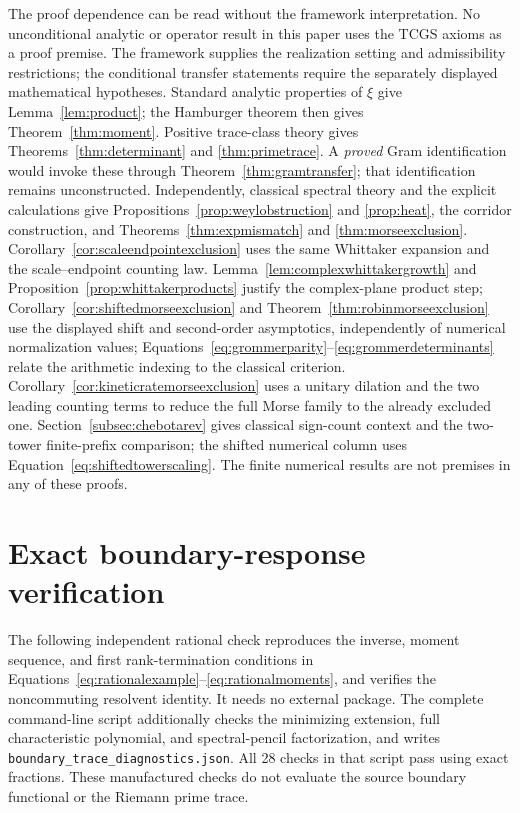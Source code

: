 \documentclass[11pt,letterpaper]{article}
\numberwithin{equation}{section}
\theoremstyle{definition}
\theoremstyle{remark}
\begin{document}
\begin{samepage}
The proof dependence can be read without the framework interpretation. No unconditional analytic or operator result in this paper uses the TCGS axioms as a proof premise. The framework supplies the realization setting and admissibility restrictions; the conditional transfer statements require the separately displayed mathematical hypotheses. Standard analytic properties of $\xi$ give Lemma~\ref{lem:product}; the Hamburger theorem then gives Theorem~\ref{thm:moment}. Positive trace-class theory gives Theorems~\ref{thm:determinant} and \ref{thm:primetrace}. A \emph{proved} Gram identification would invoke these through Theorem~\ref{thm:gramtransfer}; that identification remains unconstructed. Independently, classical spectral theory and the explicit calculations give Propositions~\ref{prop:weylobstruction} and \ref{prop:heat}, the corridor construction, and Theorems~\ref{thm:expmismatch} and \ref{thm:morseexclusion}. Corollary~\ref{cor:scaleendpointexclusion} uses the same Whittaker expansion and the scale--endpoint counting law. Lemma~\ref{lem:complexwhittakergrowth} and Proposition~\ref{prop:whittakerproducts} justify the complex-plane product step; Corollary~\ref{cor:shiftedmorseexclusion} and Theorem~\ref{thm:robinmorseexclusion} use the displayed shift and second-order asymptotics, independently of numerical normalization values; Equations~\eqref{eq:grommerparity}--\eqref{eq:grommerdeterminants} relate the arithmetic indexing to the classical criterion. Corollary~\ref{cor:kineticratemorseexclusion} uses a unitary dilation and the two leading counting terms to reduce the full Morse family to the already excluded one. Section~\ref{subsec:chebotarev} gives classical sign-count context and the two-tower finite-prefix comparison; the shifted numerical column uses Equation~\eqref{eq:shiftedtowerscaling}. The finite numerical results are not premises in any of these proofs.\par
\end{samepage}

\section{Exact boundary-response verification}
\label{app:boundarycode}
The following independent rational check reproduces the inverse, moment sequence, and first rank-termination conditions in Equations~\eqref{eq:rationalexample}--\eqref{eq:rationalmoments}, and verifies the noncommuting resolvent identity. It needs no external package. The complete command-line script additionally checks the minimizing extension, full characteristic polynomial, and spectral-pencil factorization, and writes \texttt{boundary\_trace\_diagnostics.json}. All 28 checks in that script pass using exact fractions. These manufactured checks do not evaluate the source boundary functional or the Riemann prime trace.
\end{document}
